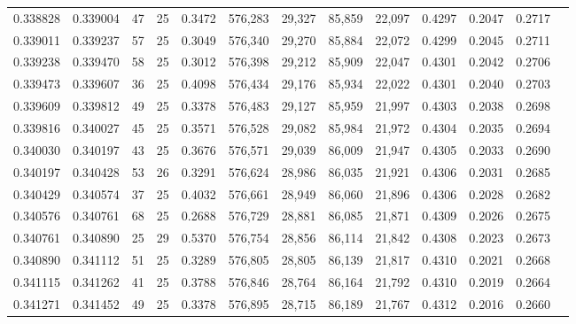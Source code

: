 \begin{tabular}{rrrrrrrrrrrrr}
0.338828 & 0.339004 &    47 &  25 &                                     0.3472 & 576,283 &  29,327 &  85,859 &  22,097 & 0.4297 & 0.2047 & 0.2717 \\
0.339011 & 0.339237 &    57 &  25 &                                     0.3049 & 576,340 &  29,270 &  85,884 &  22,072 & 0.4299 & 0.2045 & 0.2711 \\
0.339238 & 0.339470 &    58 &  25 &                                     0.3012 & 576,398 &  29,212 &  85,909 &  22,047 & 0.4301 & 0.2042 & 0.2706 \\
0.339473 & 0.339607 &    36 &  25 &                                     0.4098 & 576,434 &  29,176 &  85,934 &  22,022 & 0.4301 & 0.2040 & 0.2703 \\
0.339609 & 0.339812 &    49 &  25 &                                     0.3378 & 576,483 &  29,127 &  85,959 &  21,997 & 0.4303 & 0.2038 & 0.2698 \\
0.339816 & 0.340027 &    45 &  25 &                                     0.3571 & 576,528 &  29,082 &  85,984 &  21,972 & 0.4304 & 0.2035 & 0.2694 \\
0.340030 & 0.340197 &    43 &  25 &                                     0.3676 & 576,571 &  29,039 &  86,009 &  21,947 & 0.4305 & 0.2033 & 0.2690 \\
0.340197 & 0.340428 &    53 &  26 &                                     0.3291 & 576,624 &  28,986 &  86,035 &  21,921 & 0.4306 & 0.2031 & 0.2685 \\
0.340429 & 0.340574 &    37 &  25 &                                     0.4032 & 576,661 &  28,949 &  86,060 &  21,896 & 0.4306 & 0.2028 & 0.2682 \\
0.340576 & 0.340761 &    68 &  25 &                                     0.2688 & 576,729 &  28,881 &  86,085 &  21,871 & 0.4309 & 0.2026 & 0.2675 \\
0.340761 & 0.340890 &    25 &  29 &                                     0.5370 & 576,754 &  28,856 &  86,114 &  21,842 & 0.4308 & 0.2023 & 0.2673 \\
0.340890 & 0.341112 &    51 &  25 &                                     0.3289 & 576,805 &  28,805 &  86,139 &  21,817 & 0.4310 & 0.2021 & 0.2668 \\
0.341115 & 0.341262 &    41 &  25 &                                     0.3788 & 576,846 &  28,764 &  86,164 &  21,792 & 0.4310 & 0.2019 & 0.2664 \\
0.341271 & 0.341452 &    49 &  25 &                                     0.3378 & 576,895 &  28,715 &  86,189 &  21,767 & 0.4312 & 0.2016 & 0.2660 \\

\end{tabular}
